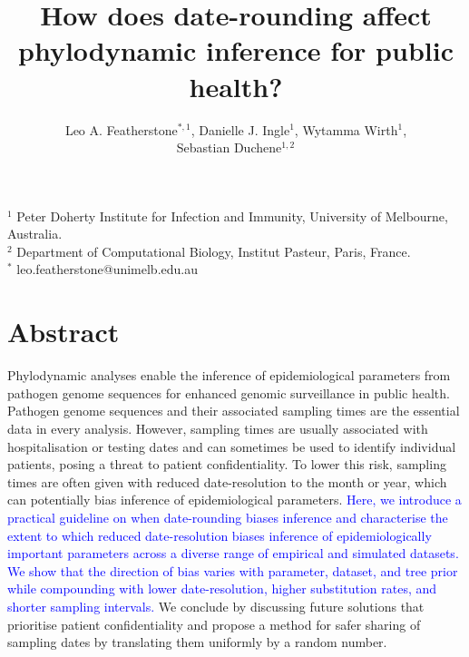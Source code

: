 \documentclass[12pt]{article}
\title{How does date-rounding affect phylodynamic inference for public health?}
\author{Leo A. Featherstone$^{\ast,1}$, Danielle J. Ingle$^{1}$, Wytamma Wirth$^{1}$,\\Sebastian Duchene$^{1,2}$}
\begin{document}
\maketitle

\section*{}
\footnotesize
$^{1}$ Peter Doherty Institute for Infection and Immunity, University of Melbourne, Australia.\\
$^{2}$ Department of Computational Biology, Institut Pasteur, Paris, France.\\
$^{*}$ leo.featherstone@unimelb.edu.au

\normalsize
\linenumbers

\section*{Abstract}
Phylodynamic analyses enable the inference of epidemiological parameters from pathogen genome sequences for enhanced genomic surveillance in public health. Pathogen genome sequences and their associated sampling times are the essential data in every analysis. However, sampling times are usually associated with hospitalisation or testing dates and can sometimes be used to identify individual patients, posing a threat to patient confidentiality. To lower this risk, sampling times are often given with reduced date-resolution to the month or year, which can potentially bias inference of epidemiological parameters. \textcolor{blue}{Here, we introduce a practical guideline on when date-rounding biases inference and characterise the extent to which reduced date-resolution biases inference of epidemiologically important parameters across a diverse range of empirical and simulated datasets. We show that the direction of bias varies with parameter, dataset, and tree prior while compounding with lower date-resolution, higher substitution rates, and shorter sampling intervals.} We conclude by discussing future solutions that prioritise patient confidentiality and propose a method for safer sharing of sampling dates by translating them uniformly by a random number.
\end{document}
